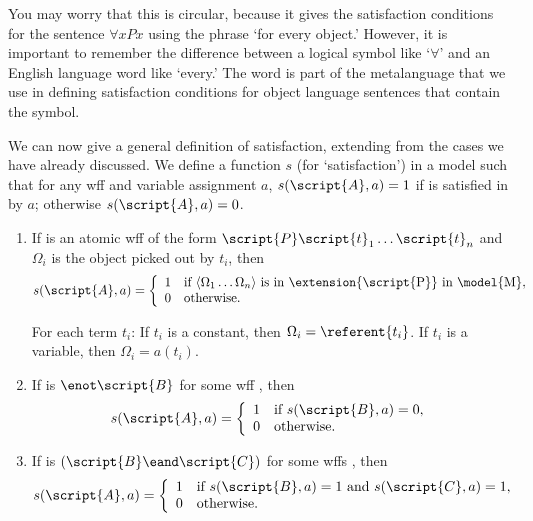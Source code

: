 You may worry that this is circular, because it gives the satisfaction conditions for the sentence $\forall x Px$ using the phrase `for every object.' However, it is important to remember the difference between a logical symbol like `$\forall$' and an English language word like `every.' The word is part of the metalanguage that we use in defining satisfaction conditions for object language sentences that contain the symbol.

We can now give a general definition of satisfaction, extending from the cases we have already discussed. We define a function $s$ (for `satisfaction') in a model  such that for any wff  and variable assignment $a$, $s(\script{A}, a)=1$ if  is satisfied in  by $a$; otherwise $s(\script{A}, a)=0$.

\begin{enumerate}
\item If  is an atomic wff of the form $\script{P}\script{t}_1\ldots\script{t}_n$ and $\Omega_i$ is the object picked out by $t_i$, then
\begin{displaymath}s(\script{A}, a) =
	\left\{\begin{array}{ll}
	1 & \mbox{if ${\langle}\Omega_1\ldots\Omega_n{\rangle}$ is in \extension{\script{P}} in \model{M}},\\
	0 & \mbox{otherwise.}
	\end{array}\right.
\end{displaymath}

For each term $t_i$: If $t_i$ is a constant, then $\Omega_i = \referent{t_i}$. If $t_i$ is a variable, then $\Omega_i = a(t_i)$.

\item If  is ${\enot}\script{B}$ for some wff , then
\begin{displaymath}s(\script{A}, a) =
	\left\{\begin{array}{ll}
	1 & \mbox{if $s(\script{B}, a) = 0$},\\
	0 & \mbox{otherwise.}
	\end{array}\right.
\end{displaymath}



\item If  is $(\script{B}\eand\script{C})$ for some wffs , then
\begin{displaymath}s(\script{A}, a) =
	\left\{\begin{array}{ll}
	1 & \mbox{if $s(\script{B}, a) = 1$ and $s(\script{C}, a) = 1$,}\\
	0 & \mbox{otherwise.}
	\end{array}\right.
\end{displaymath}


\end{enumerate}
